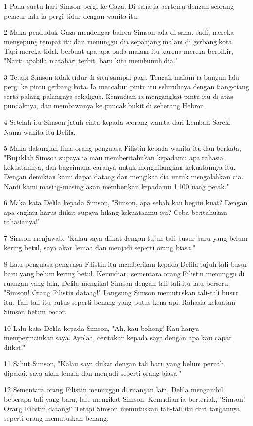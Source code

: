 \par 1 Pada suatu hari Simson pergi ke Gaza. Di sana ia bertemu dengan seorang pelacur lalu ia pergi tidur dengan wanita itu.
\par 2 Maka penduduk Gaza mendengar bahwa Simson ada di sana. Jadi, mereka mengepung tempat itu dan menunggu dia sepanjang malam di gerbang kota. Tapi mereka tidak berbuat apa-apa pada malam itu karena mereka berpikir, "Nanti apabila matahari terbit, baru kita membunuh dia."
\par 3 Tetapi Simson tidak tidur di situ sampai pagi. Tengah malam ia bangun lalu pergi ke pintu gerbang kota. Ia mencabut pintu itu seluruhnya dengan tiang-tiang serta palang-palangnya sekaligus. Kemudian ia mengangkat pintu itu di atas pundaknya, dan membawanya ke puncak bukit di seberang Hebron.
\par 4 Setelah itu Simson jatuh cinta kepada seorang wanita dari Lembah Sorek. Nama wanita itu Delila.
\par 5 Maka datanglah lima orang penguasa Filistin kepada wanita itu dan berkata, "Bujuklah Simson supaya ia mau memberitahukan kepadamu apa rahasia kekuatannya, dan bagaimana caranya untuk menghilangkan kekuatannya itu. Dengan demikian kami dapat datang dan mengikat dia untuk mengalahkan dia. Nanti kami masing-masing akan memberikan kepadamu 1.100 uang perak."
\par 6 Maka kata Delila kepada Simson, "Simson, apa sebab kau begitu kuat? Dengan apa engkau harus diikat supaya hilang kekuatanmu itu? Coba beritahukan rahasianya!"
\par 7 Simson menjawab, "Kalau saya diikat dengan tujuh tali busur baru yang belum kering betul, saya akan lemah dan menjadi seperti orang biasa."
\par 8 Lalu penguasa-penguasa Filistin itu memberikan kepada Delila tujuh tali busur baru yang belum kering betul. Kemudian, sementara orang Filistin menunggu di ruangan yang lain, Delila mengikat Simson dengan tali-tali itu lalu berseru, "Simson! Orang Filistin datang!" Langsung Simson memutuskan tali-tali busur itu. Tali-tali itu putus seperti benang yang putus kena api. Rahasia kekuatan Simson belum bocor.
\par 10 Lalu kata Delila kepada Simson, "Ah, kau bohong! Kau hanya mempermainkan saya. Ayolah, ceritakan kepada saya dengan apa kau dapat diikat!"
\par 11 Sahut Simson, "Kalau saya diikat dengan tali baru yang belum pernah dipakai, saya akan lemah dan menjadi seperti orang biasa."
\par 12 Sementara orang Filistin menunggu di ruangan lain, Delila mengambil beberapa tali yang baru, lalu mengikat Simson. Kemudian ia berteriak, "Simson! Orang Filistin datang!" Tetapi Simson memutuskan tali-tali itu dari tangannya seperti orang memutuskan benang.
